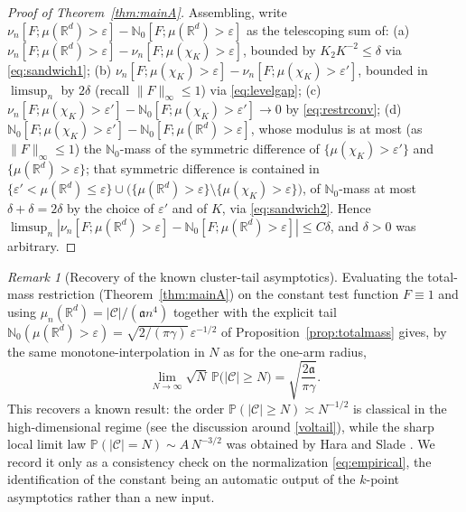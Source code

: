 \documentclass[11pt]{article}
\theoremstyle{definition}
\theoremstyle{remark}
\newtheorem{remark}[theorem]{Remark}
\newcommand{\R}{\mathbb{R}}
\newcommand{\bP}{\mathbb{P}}
\newcommand{\bN}{{\mathbb{N}_0}}                 %
\newcommand{\eps}{\varepsilon}
\numberwithin{equation}{section}
\theoremstyle{plain}
\theoremstyle{definition}
\theoremstyle{remark}
\theoremstyle{plain}
\begin{document}
\begin{proof}[Proof of Theorem~\ref{thm:mainA}]
Assembling, write
$\nu_n[F;\mu(\R^d)>\eps]-\bN[F;\mu(\R^d)>\eps]$ as the telescoping sum of:
(a) $\nu_n[F;\mu(\R^d)>\eps]-\nu_n[F;\mu(\chi_K)>\eps]$, bounded by
$K_2K^{-2}\le\delta$ via \eqref{eq:sandwich1};
(b) $\nu_n[F;\mu(\chi_K)>\eps]-\nu_n[F;\mu(\chi_K)>\eps']$, bounded in
$\limsup_n$ by $2\delta$ (recall $\|F\|_\infty\le1$) via \eqref{eq:levelgap};
(c) $\nu_n[F;\mu(\chi_K)>\eps']-\bN[F;\mu(\chi_K)>\eps']\to0$ by
\eqref{eq:restrconv};
(d) $\bN[F;\mu(\chi_K)>\eps']-\bN[F;\mu(\R^d)>\eps]$, whose modulus is at most
(as $\|F\|_\infty\le1$) the $\bN$-mass of the symmetric difference of
$\{\mu(\chi_K)>\eps'\}$ and $\{\mu(\R^d)>\eps\}$; that symmetric difference is
contained in
$\{\eps'<\mu(\R^d)\le\eps\}\cup\bigl(\{\mu(\R^d)>\eps\}\setminus\{\mu(\chi_K)>\eps\}\bigr)$,
of $\bN$-mass at most $\delta+\delta=2\delta$ by the choice of $\eps'$ and
of $K$, via \eqref{eq:sandwich2}.
Hence $\limsup_n|\nu_n[F;\mu(\R^d)>\eps]-\bN[F;\mu(\R^d)>\eps]|\le C\delta$,
and $\delta>0$ was arbitrary.
\end{proof}

\begin{remark}[Recovery of the known cluster-tail asymptotics]
\label{rem:tailknown}
Evaluating the total-mass restriction (Theorem~\ref{thm:mainA})
on the constant test function $F\equiv1$ and using
$\mu_n(\R^d)=|\mathcal C|/(\mathfrak a n^4)$ together with the explicit tail
$\bN(\mu(\R^d)>\eps)=\sqrt{2/(\pi\gamma)}\,\eps^{-1/2}$ of
Proposition~\ref{prop:totalmass} gives, by the same monotone-interpolation in
$N$ as for the one-arm radius,
\[
\lim_{N\to\infty}\sqrt N\,\bP\bigl(|\mathcal C|\ge N\bigr)
=\sqrt{\frac{2\mathfrak a}{\pi\gamma}} .
\]
This recovers a known result: the order $\bP(|\mathcal C|\ge N)\asymp N^{-1/2}$ is classical in the high-dimensional regime (see the discussion around \eqref{voltail}), while the sharp local limit law $\bP(|\mathcal C|=N)\sim A\,N^{-3/2}$ was obtained by Hara and Slade \cite{HS00b}. We record it only as a consistency
check on the normalization \eqref{eq:empirical}, the identification of the
constant being an automatic output of the $k$-point asymptotics rather than a
new input.
\end{remark}
\end{document}
